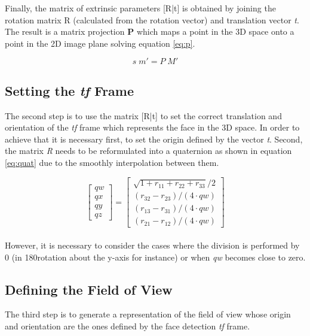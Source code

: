 \documentclass{sig-alternate}
\begin{document}
Finally, the matrix of extrinsic parameters [R|t] is obtained by joining the
rotation matrix R (calculated from the rotation vector) and translation vector
\textit{t}. The result is a matrix projection \textbf{P} which maps a point in
the 3D space onto a point in the 2D image plane solving equation \ref{eq:p}.

\begin{equation}
s  \; m' = P \; M'
\label{eq:p}
\end{equation}

\subsection{Setting the \textit{tf} Frame}
The second step is to use the matrix [R|t] to set the correct translation and
orientation of the \textit{tf} frame which represents the face in the 3D space.
In order to achieve that it is necessary first, to set the origin defined by the
vector \textit{t}. Second, the matrix \textit{R} needs to be reformulated into a
quaternion as shown in equation \ref{eq:quat} due to the smoothly interpolation
between them.

\begin{equation}
\begin{bmatrix}
qw \\
qx \\
qy \\
qz
\end{bmatrix}
=
\begin{bmatrix}
\sqrt{1 + r_{11} + r_{22} + r_{33}} /2 \\
(r_{32} - r_{23})/( 4 \cdot qw) \\
(r_{13} - r_{31})/( 4 \cdot qw) \\
(r_{21} - r_{12})/( 4 \cdot qw)
\end{bmatrix}
\label{eq:quat}
\end{equation}
\\
However, it is necessary to consider the cases where the division is performed
by 0 (in 180\degree rotation about the y-axis for instance) or when \textit{qw}
becomes close to zero.

\subsection{Defining the Field of View}
The third step is to generate a representation of the field of view whose origin
and orientation are the ones defined by the face detection \textit{tf} frame. 
\end{document}
